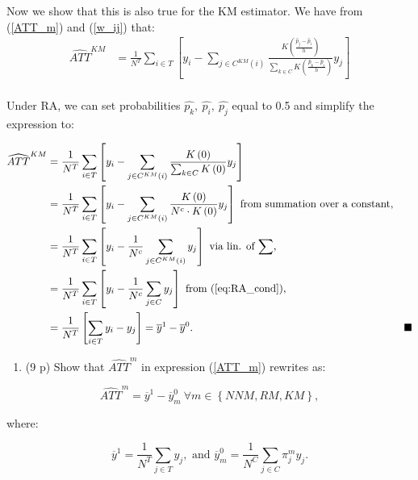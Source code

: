 \documentclass[
]{article}
\providecommand{\tightlist}{%
  \setlength{\itemsep}{0pt}\setlength{\parskip}{0pt}}
\begin{document}
Now we show that this is also true for the KM estimator. We have from
(\ref{ATT_m}) and (\ref{w_ij}) that: \begin{align*}
    \widehat{ATT}^{KM} &= \frac{1}{N^T} \sum_{i \in T} \left[  y_i - \sum_{j \in C^{KM}\left( i\right)}\frac{K\left( \frac{\hat{p}_{j} - \hat{p}_{i}}{h}\right)}{\sum_{k \in C}K \left( \frac{\hat{p}_{k}-\hat{p}_{i}}{h}\right)} y_j \right ] \\
  \end{align*}

Under RA, we can set probabilities
\(\hat{p_k}, \ \hat{p_i}, \ \hat{p_j}\) equal to 0.5 and simplify the
expression to:

\begin{align*}
    \widehat{ATT}^{KM} &= \frac{1}{N^T} \sum_{i \in T} \left[  y_i - \sum_{j \in C^{KM}\left( i\right)}\frac{K\left(0\right)}{\sum_{k \in C} K \left(0\right)} y_j \right] \\
                       &= \frac{1}{N^T} \sum_{i \in T} \left[  y_i - \sum_{j \in C^{KM}\left( i\right)}\frac{K\left(0\right)}{N^c \cdot K \left(0\right)} y_j \right] \text{ from summation over a constant,} \\
                       &= \frac{1}{N^T} \sum_{i \in T} \left[  y_i - \frac{1}{N^c} \sum_{j \in C^{KM}\left( i\right)} y_j \right] \text{ via lin. of $\sum$,} \\
                       &= \frac{1}{N^T} \sum_{i \in T} \left[  y_i - \frac{1}{N^c} \sum_{j \in C} y_j \right] \text{ from (\ref{eq:RA_cond}),} \\
                       &= \frac{1}{N^T} \left[ \sum_{i \in T} y_i - y_j \right] = \overline{y}^{1} - \overline{y}^{0}. & \blacksquare
  \end{align*}

\begin{enumerate}
\def\labelenumi{\arabic{enumi}.}
\setcounter{enumi}{4}
\tightlist
\item
  (9 p) Show that \(\widehat{ATT}^{m}\) in expression (\ref{ATT_m})
  rewrites as:
\end{enumerate}

\begin{equation} \label{ATT_m_bis}
\widehat{ATT}^{m} =\overline{y}^{1}-\overline{y}_{m}^{0} \ \forall m\in \left\{ NNM,RM,KM\right\},
\end{equation}

\noindent where:

\begin{equation}\label{ATT_m_bis_w}
\overline{y}^{1} =\frac{1}{N^{T}}\sum_{j \in T}y_{j}, \text{     and      }  \overline{y}_{m}^{0} =\frac{1}{N^{C}}\sum_{j \in C}\pi_{j}^{m}y_{j}.
\end{equation}
\end{document}
